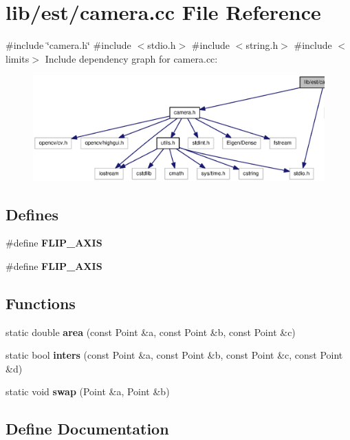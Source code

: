 \section{lib/est/camera.cc \-File \-Reference}
\label{camera_8cc}
{\ttfamily \#include \char`\"{}camera.\-h\char`\"{}}\*
{\ttfamily \#include $<$stdio.\-h$>$}\*
{\ttfamily \#include $<$string.\-h$>$}\*
{\ttfamily \#include $<$limits$>$}\*
\-Include dependency graph for camera.\-cc\-:
\nopagebreak
\begin{figure}[H]
\begin{center}
\leavevmode
\includegraphics[width=350pt]{camera_8cc__incl}
\end{center}
\end{figure}
\subsection*{\-Defines}
\begin{DoxyCompactItemize}
\item 
\#define {\bf \-F\-L\-I\-P\-\_\-\-A\-X\-I\-S}
\item 
\#define {\bf \-F\-L\-I\-P\-\_\-\-A\-X\-I\-S}
\end{DoxyCompactItemize}
\subsection*{\-Functions}
\begin{DoxyCompactItemize}
\item 
static double {\bf area} (const \-Point \&a, const \-Point \&b, const \-Point \&c)
\item 
static bool {\bf inters} (const \-Point \&a, const \-Point \&b, const \-Point \&c, const \-Point \&d)
\item 
static void {\bf swap} (\-Point \&a, \-Point \&b)
\end{DoxyCompactItemize}


\subsection{\-Define \-Documentation}

